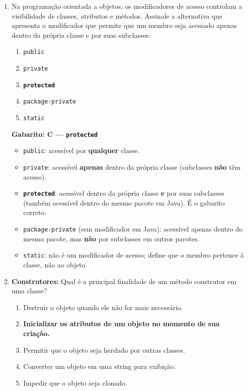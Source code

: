 \documentclass[12pt,a4paper]{article}
\begin{document}
\begin{enumerate}
\item Na programação orientada a objetos, os modificadores de acesso controlam a visibilidade de classes, atributos e métodos. Assinale a alternativa que apresenta o modificador que permite que um membro seja acessado apenas dentro da própria classe e por suas subclasses:
    \begin{enumerate}[label=\Alph*)]
        \item \texttt{public}
        \item \texttt{private}
        \item[\textbf{C)}] \textbf{\texttt{protected}} \checkmark
        \item \texttt{package-private}
        \item \texttt{static}
    \end{enumerate}

\begin{tcolorbox}[respostabox]
\textbf{Gabarito: C — \texttt{protected}}

\begin{itemize}
    \item \texttt{public}: acessível por \textbf{qualquer} classe.
    \item \texttt{private}: acessível \textbf{apenas} dentro da própria classe (subclasses \textbf{não} têm acesso).
    \item \textbf{\texttt{protected}}: acessível dentro da própria classe \textbf{e} por suas subclasses (também acessível dentro do mesmo pacote em Java). É o gabarito correto.
    \item \texttt{package-private} (sem modificador em Java): acessível apenas dentro do mesmo pacote, mas \textbf{não} por subclasses em outros pacotes.
    \item \texttt{static}: não é um modificador de acesso; define que o membro pertence à classe, não ao objeto.
\end{itemize}
\end{tcolorbox}

\vspace{0.4cm}

\item \textbf{Construtores:} Qual é a principal finalidade de um método construtor em uma classe?
    \begin{enumerate}[label=\Alph*)]
        \item Destruir o objeto quando ele não for mais necessário.
        \item[\textbf{B)}] \textbf{Inicializar os atributos de um objeto no momento de sua criação.} \checkmark
        \item Permitir que o objeto seja herdado por outras classes.
        \item Converter um objeto em uma string para exibição.
        \item Impedir que o objeto seja clonado.
    \end{enumerate}


\end{enumerate}
\end{document}
